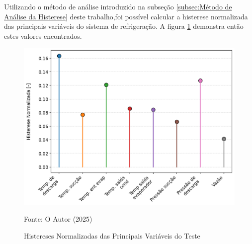 Utilizando o método de análise introduzido na subseção \ref{subsec:Método de Análise da Histerese} deste trabalho,foi possível  calcular a histerese normalizada das principais variáveis do sistema de refrigeração. A figura \ref{fig:histereses normalizadas} demonstra então estes valores encontrados.
 \newpage
\begin{figure}[h] 

    \centering
    \includegraphics[width=1\linewidth]{FigurasdoTexto/Histereses Normalizadas.png}
    \caption{Histereses Normalizadas das Principais Variáveis do Teste}
    \label{fig:histereses normalizadas}
    {\footnotesize Fonte: O Autor (2025)}
\end{figure}

